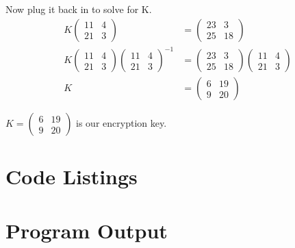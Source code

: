\documentclass[10pt,letterpaper]{report}
\begin{document}
\begin{enumerate}
	Now plug it back in to solve for K.
		\begin{align*}
	K \begin{pmatrix} 11 & 4 \\ 21 & 3	\end{pmatrix} &=
	\begin{pmatrix} 23 & 3 \\ 25 & 18	\end{pmatrix} \\
		K \begin{pmatrix} 11 & 4 \\ 21 & 3	\end{pmatrix}
		\begin{pmatrix} 11 & 4 \\ 21 & 3	\end{pmatrix}^{-1}		 &=
	\begin{pmatrix} 23 & 3 \\ 25 & 18	\end{pmatrix} \begin{pmatrix} 11 & 4 \\ 21 & 3	\end{pmatrix} 
	\\ K &= \begin{pmatrix}
	6 & 19 \\ 9 & 20
	\end{pmatrix}
	\end{align*}

	$K = \begin{pmatrix}
	6 & 19 \\ 9 & 20
	\end{pmatrix}$ is our encryption key.
		
\end{enumerate}

\begin{appendices}
\chapter{Code Listings}



\chapter{Program Output}





\end{appendices}
\end{document}
